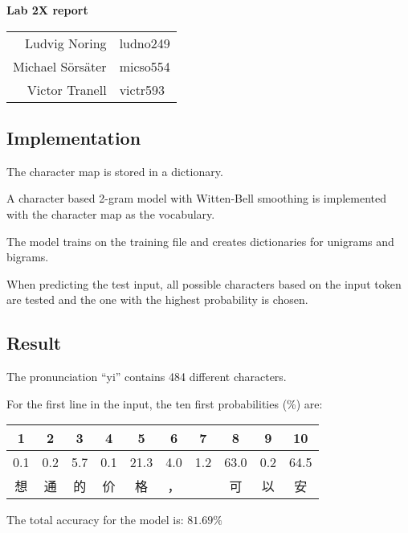 \documentclass[12pt,a4paper]{article}
\begin{document}
\begin{center}

	\vspace{0.7cm}
	\LARGE
	\textbf{Lab 2X report }

	\Large
	\begin{table}[h]
	\centering
		\begin{tabular}{ r l }
		Ludvig Noring & ludno249 \\ Michael Sörsäter & micso554 \\ Victor Tranell &  victr593 \\
		\end{tabular}
	\end{table}
\end{center}

\subsection*{Implementation}
The character map is stored in a dictionary.

A character based 2-gram model with Witten-Bell smoothing is implemented with the character map as the vocabulary.

The model trains on the training file and creates dictionaries for unigrams and bigrams.

When predicting the test input, all possible characters based on the input token are tested and the one with the highest probability is chosen.

\subsection*{Result}
The pronunciation ``yi'' contains 484 different characters.

For the first line in the input, the ten first probabilities (\%) are:
\begin{CJK}{UTF8}{gbsn}
	\begin{table}[h]
	\centering
		\begin{tabular}{ c c c c c c c c c c}
		1   & 2   & 3   & 4   & 5    & 6   & 7   & 8    & 9   & 10 \\ \hline
		0.1 & 0.2 & 5.7 & 0.1 & 21.3 & 4.0 & 1.2 & 63.0 & 0.2 & 64.5 \\
		想 & 通 & 的 & 价& 格& ，& & 可& 以 & 安
		\end{tabular}
	\end{table}
\end{CJK}

The total accuracy for the model is: $81.69 \%$
\end{document}
